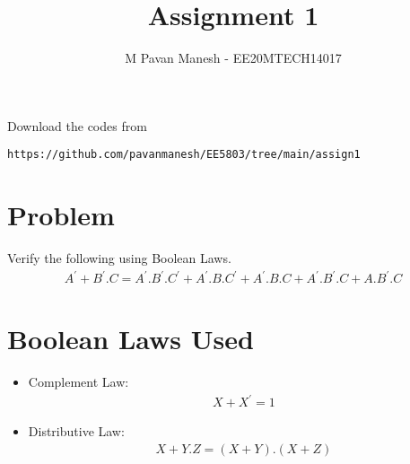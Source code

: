 \documentclass[journal,12pt]{IEEEtran}
\begin{document}
     \def\rightbox#1{\makebox[0in][r]{#1}}
     \def\centbox#1{\makebox[0in]{#1}}
     \def\topbox#1{\raisebox{-\baselineskip}[0in][0in]{#1}}
     \def\midbox#1{\raisebox{-0.5\baselineskip}[0in][0in]{#1}}
\vspace{3cm}
\title{Assignment 1}
\author{M Pavan Manesh - EE20MTECH14017}
\maketitle
\bigskip
\renewcommand{\thefigure}{\theenumi}
\renewcommand{\thetable}{\theenumi}
%
Download the codes from 
%
\begin{lstlisting}
https://github.com/pavanmanesh/EE5803/tree/main/assign1
\end{lstlisting}
\section{\textbf{Problem}}
Verify the following using Boolean Laws.
\begin{align}
    A^{'}+B^{'}.C=A^{'}.B^{'}.C^{'}+A^{'}.B.C^{'}+A^{'}.B.C+A^{'}.B^{'}.C+A.B^{'}.C \nonumber
\end{align}
\section{\textbf{Boolean Laws Used}}
\begin{itemize}
    \item Complement Law: 
    \begin{align}
        X+X^{'}=1\label{1}
    \end{align}
    \item Distributive Law:
    \begin{align}
        X+Y.Z=(X+Y).(X+Z)\label{2}
    \end{align}
\end{itemize}
\end{document}

